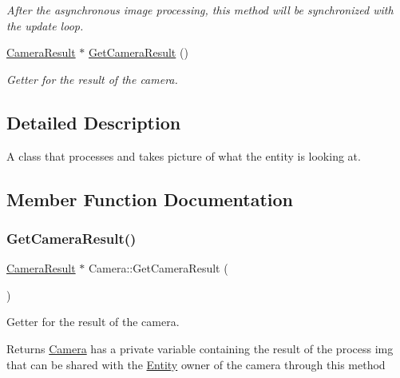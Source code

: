 \begin{DoxyCompactItemize}
\begin{DoxyCompactList}\small\item\em After the asynchronous image processing, this method will be synchronized with the update loop. \end{DoxyCompactList}\item 
\hyperlink{classCameraResult}{Camera\+Result} $\ast$ \hyperlink{classCamera_af98a21b496a5d63ca5cc6c813d3c6587}{Get\+Camera\+Result} ()
\begin{DoxyCompactList}\small\item\em Getter for the result of the camera. \end{DoxyCompactList}\end{DoxyCompactItemize}


\subsection{Detailed Description}
A class that processes and takes picture of what the entity is looking at. 

\subsection{Member Function Documentation}
\mbox{\label{classCamera_af98a21b496a5d63ca5cc6c813d3c6587}} 
\subsubsection{\texorpdfstring{Get\+Camera\+Result()}{GetCameraResult()}}
{\footnotesize\ttfamily \hyperlink{classCameraResult}{Camera\+Result} $\ast$ Camera\+::\+Get\+Camera\+Result (\begin{DoxyParamCaption}{ }\end{DoxyParamCaption})}



Getter for the result of the camera. 

\begin{DoxyReturn}{Returns}
\hyperlink{classCamera}{Camera} has a private variable containing the result of the process img that can be shared with the \hyperlink{classEntity}{Entity} owner of the camera through this method 
\end{DoxyReturn}
\mbox{\label{classCamera_aa44e2101b2cf0a75ab1fd498f3f7adea}} 
